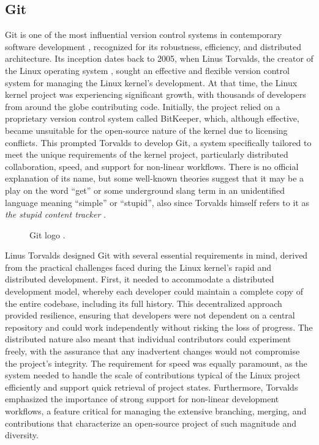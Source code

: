 \subsection{Git}
\label{sec:git}
Git \cite{torvalds_git_nodate} is one of the most influential version control systems in contemporary software development \cite{loeliger_version_2012,bird_promises_2009}, recognized for its robustness, efficiency, and distributed architecture. Its inception dates back to 2005, when Linus Torvalds, the creator of the Linux operating system \cite{torvalds_linux_nodate}, sought an effective and flexible version control system for managing the Linux kernel's development. At that time, the Linux kernel project was experiencing significant growth, with thousands of developers from around the globe contributing code. Initially, the project relied on a proprietary version control system called BitKeeper, which, although effective, became unsuitable for the open-source nature of the kernel due to licensing conflicts. This prompted Torvalds to develop Git, a system specifically tailored to meet the unique requirements of the kernel project, particularly distributed collaboration, speed, and support for non-linear workflows. There is no official explanation of its name, but some well-known theories suggest that it may be a play on the word ``get'' or some underground slang term in an unidentified language meaning ``simple'' or ``stupid'', also since Torvalds himself refers to it as \emph{the stupid content tracker} \cite{torvalds_git_nodate}.
\begin{figure}[t!]
  \centering
  
  \caption{Git logo \cite{torvalds_git_nodate}.}
  \label{fig:gitlogo}
\end{figure}

Linus Torvalds designed Git with several essential requirements in mind, derived from the practical challenges faced during the Linux kernel's rapid and distributed development. First, it needed to accommodate a distributed development model, whereby each developer could maintain a complete copy of the entire codebase, including its full history. This decentralized approach provided resilience, ensuring that developers were not dependent on a central repository and could work independently without risking the loss of progress. The distributed nature also meant that individual contributors could experiment freely, with the assurance that any inadvertent changes would not compromise the project's integrity. The requirement for speed was equally paramount, as the system needed to handle the scale of contributions typical of the Linux project efficiently and support quick retrieval of project states. Furthermore, Torvalds emphasized the importance of strong support for non-linear development workflows, a feature critical for managing the extensive branching, merging, and contributions that characterize an open-source project of such magnitude and diversity.


